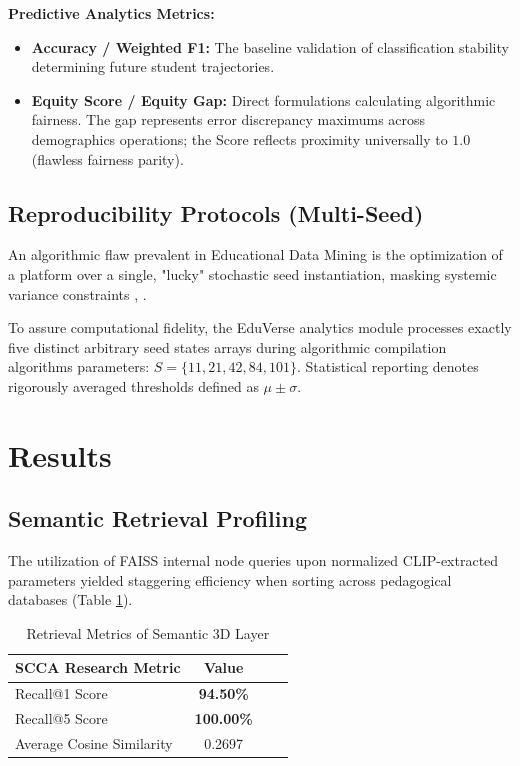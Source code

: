 \documentclass[conference]{IEEEtran}
\begin{document}
\textbf{Predictive Analytics Metrics:}
\begin{itemize}
    \item \textbf{Accuracy / Weighted F1:} The baseline validation of classification stability determining future student trajectories.
    \item \textbf{Equity Score / Equity Gap:} Direct formulations calculating algorithmic fairness. The gap represents error discrepancy maximums across demographics operations; the Score reflects proximity universally to $1.0$ (flawless fairness parity).
\end{itemize}

\subsection{Reproducibility Protocols (Multi-Seed)}

An algorithmic flaw prevalent in Educational Data Mining is the optimization of a platform over a single, "lucky" stochastic seed instantiation, masking systemic variance constraints \cite{walker2021reproducibility}, \cite{nelson2024multiseed}. 

To assure computational fidelity, the EduVerse analytics module processes exactly five distinct arbitrary seed states arrays during algorithmic compilation algorithms parameters: $S = \{11, 21, 42, 84, 101\}$. Statistical reporting denotes rigorously averaged thresholds defined as $\mu \pm \sigma$. 

\section{Results}

\subsection{Semantic Retrieval Profiling}

The utilization of FAISS internal node queries upon normalized CLIP-extracted parameters yielded staggering efficiency when sorting across pedagogical databases (Table \ref{tab:ret_results}).

\begin{table}[ht]
\centering
\caption{Retrieval Metrics of Semantic 3D Layer}
\label{tab:ret_results}
\begin{tabular}{lc|cl}
\toprule
\textbf{SCCA Research Metric} & \textbf{Value} \\
\midrule
Recall@1 Score & \textbf{94.50\%} \\
Recall@5 Score & \textbf{100.00\%} \\
Average Cosine Similarity & 0.2697 \\
\bottomrule
\end{tabular}
\end{table}
\end{document}
